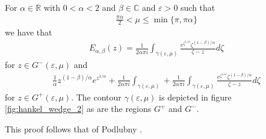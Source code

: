 \begin{lemma}
    \label{lem:mit_lef_contour_1}
    For $ \alpha \in \mathbb{R} $ with $ 0 < \alpha < 2 $ and $ \beta \in \mathbb{C} $ and $ \varepsilon > 0 $
    such that
    \begin{align}
        \label{eq:mit_lef_region}
	    \frac{\pi \alpha}{2} < \mu \leq \min\{ \pi, \pi \alpha \}
    \end{align}
    we have that
    \begin{align}
	E_{\alpha, \beta}(z) = \frac{1}{2\alpha\pi i} \int_{\gamma(\varepsilon, \mu)} \frac{e^{\zeta^{1 / \alpha}}\zeta^{(1-\beta)/\alpha}}{\zeta - z} d\zeta
    \end{align}
    for $ z \in G^{-}(\varepsilon, \mu) $
    and
    \begin{align}
    \label{eq:mit_lef_contour_2}
	\frac{1}{\alpha} z^{(1-\beta) / \alpha} e^{z^{1 / \alpha}} + \frac{1}{2 \alpha\pi i} \int_{\gamma(\varepsilon, \mu)} + \frac{1}{2\alpha\pi i} \int_{\gamma(\varepsilon, \mu)} \frac{e^{\zeta^{1 / \alpha}}\zeta^{(1-\beta)/\alpha}}{\zeta - z} d\zeta
    \end{align}
    for $ z \in G^{+}(\varepsilon, \mu) $.
    The contour $ \gamma(\varepsilon, \mu) $ is depicted in figure \ref{fig:hankel_wedge_2} as are the regions $ G^+ $ and $ G^-$.
\end{lemma}
This proof follows that of Podlubny \cite{Podlubny1999}.
